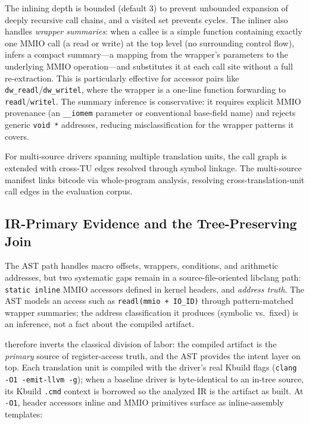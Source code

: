The inlining depth is bounded (default 3) to prevent unbounded expansion of deeply recursive call chains, and a visited set prevents cycles. The inliner also handles \emph{wrapper summaries}: when a callee is a simple function containing exactly one MMIO call (a read or write) at the top level (no surrounding control flow), \reharness{} infers a compact summary---a mapping from the wrapper's parameters to the underlying MMIO operation---and substitutes it at each call site without a full re-extraction. This is particularly effective for accessor pairs like \texttt{dw\_readl}/\texttt{dw\_writel}, where the wrapper is a one-line function forwarding to \texttt{readl}/\texttt{writel}. The summary inference is conservative: it requires explicit MMIO provenance (an \texttt{\_\_iomem} parameter or conventional base-field name) and rejects generic \texttt{void~*} addresses, reducing misclassification for the wrapper patterns it covers.

For multi-source drivers spanning multiple translation units, the call graph is extended with cross-TU edges resolved through symbol linkage. The multi-source manifest links bitcode via whole-program analysis, resolving \MultiSourceCrossTUEdges{} cross-translation-unit call edges in the evaluation corpus.

\subsection{IR-Primary Evidence and the Tree-Preserving Join}
\label{sec:irprimary}

The AST path handles macro offsets, wrappers, conditions, and arithmetic
addresses, but two systematic gaps remain in a source-file-oriented libclang
path: \texttt{static~inline} MMIO accessors defined in kernel headers, and
\emph{address truth}. The AST models an access such as
\texttt{readl(mmio + IO\_ID)} through pattern-matched wrapper summaries; the
address classification it produces (symbolic vs.\ fixed) is an inference, not
a fact about the compiled artifact.

\reharness{} therefore inverts the classical division of labor: the compiled
artifact is the \emph{primary} source of register-access truth, and the AST
provides the intent layer on top. Each translation unit is compiled with the
driver's real Kbuild flags (\texttt{clang -O1 -emit-llvm -g}); when a
baseline driver is byte-identical to an in-tree source, its Kbuild
\texttt{.cmd} context is borrowed so the analyzed IR is the artifact as
built. At \texttt{-O1}, header accessors inline and MMIO primitives surface
as inline-assembly templates:

